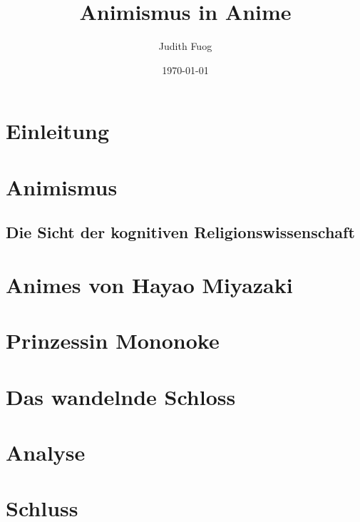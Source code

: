 \documentclass[a4paper]{article}
\title{Animismus in Anime}
\author{Judith Fuog}
\date{\today}
\begin{document}
\maketitle
\tableofcontents
\newpage

\section{Einleitung}


\section{Animismus}

\subsection{Die Sicht der kognitiven Religionswissenschaft}


\section{Animes von Hayao Miyazaki}


\section{Prinzessin Mononoke}


\section{Das wandelnde Schloss}


\section{Analyse}


\section{Schluss}

\end{document}
